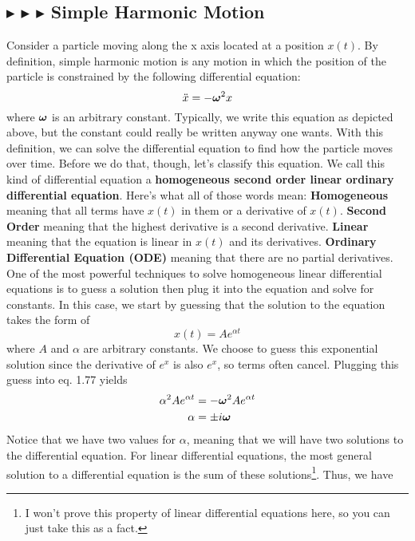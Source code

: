 \subsection{\color{PineGreen} $\blacktriangleright$ \color{Goldenrod} $\blacktriangleright$ \color{Orchid} $\blacktriangleright$ \color{black} Simple Harmonic Motion} \label{1.6.1}
Consider a particle moving along the x axis located at a position $x(t)$. By definition, simple harmonic motion is any motion in which the position of the particle is constrained by the following differential equation:
\begin{equation}
    \ddot{x} = -\boldsymbol{\omega}^2 x
\end{equation}
\noindent where $\boldsymbol{\omega}$ is an arbitrary constant. Typically, we write this equation as depicted above, but the constant could really be written anyway one wants. With this definition, we can solve the differential equation to find how the particle moves over time. Before we do that, though, let's classify this equation. We call this kind of differential equation a \textbf{homogeneous second order linear ordinary differential equation}. Here's what all of those words mean: \textbf{Homogeneous} meaning that all terms have $x(t)$ in them or a derivative of $x(t)$. \textbf{Second Order} meaning that the highest derivative is a second derivative. \textbf{Linear} meaning that the equation is linear in $x(t)$ and its derivatives. \textbf{Ordinary Differential Equation (ODE)} meaning that there are no partial derivatives. One of the most powerful techniques to solve homogeneous linear differential equations is to guess a solution then plug it into the equation and solve for constants. In this case, we start by guessing that the solution to the equation takes the form of 
\begin{equation*}
    x(t) = Ae^{\alpha t}
\end{equation*}
\noindent where $A$ and $\alpha$ are arbitrary constants. We choose to guess this exponential solution since the derivative of $e^x$ is also $e^x$, so terms often cancel. Plugging this guess into eq. 1.77 yields 
\begin{align*}
    \alpha^2Ae^{\alpha t} &= -\boldsymbol{\omega}^2 Ae^{\alpha t} \\
    \alpha &= \pm i\boldsymbol{\omega}
\end{align*}
\noindent Notice that we have two values for $\alpha$, meaning that we will have two solutions to the differential equation. For linear differential equations, the most general solution to a differential equation is the sum of these solutions\footnote{I won't prove this property of linear differential equations here, so you can just take this as a fact.}. Thus, we have 
